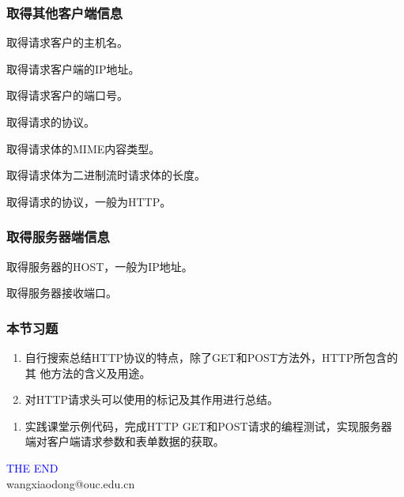 \begin{frame}[fragile] %
  \frametitle{取得其他客户端信息} 

   取得请求客户的主机名。

   取得请求客户端的IP地址。

   取得请求客户的端口号。

   取得请求的协议。
  
   取得请求体的MIME内容类型。

   取得请求体为二进制流时请求体的长度。

   取得请求的协议，一般为HTTP。
\end{frame}

\begin{frame}[fragile] %
  \frametitle{取得服务器端信息} 

   取得服务器的HOST，一般为IP地址。

   取得服务器接收端口。
\end{frame}

\begin{frame}
  \frametitle{本节习题}

  
  \begin{enumerate}
  \item 自行搜索总结HTTP协议的特点，除了GET和POST方法外，HTTP所包含的其
    他方法的含义及用途。
  \item 对HTTP请求头可以使用的标记及其作用进行总结。
  \end{enumerate}

  \begin{enumerate}
  \item 实践课堂示例代码，完成HTTP GET和POST请求的编程测试，实现服务器
    端对客户端请求参数和表单数据的获取。
  \end{enumerate}
\end{frame}

\begin{frame}
\centering
{\Huge \textcolor{blue}{THE END}} \\
\vspace{5mm}
{\Large wangxiaodong@ouc.edu.cn} \\
\end{frame}

